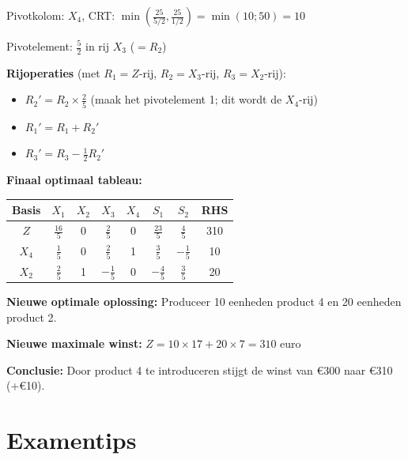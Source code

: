 \documentclass[a4paper,11pt]{article}
\begin{document}
\begin{oefenblok}
    Pivotkolom: $X_4$, CRT: $\min\left(\frac{25}{5/2}, \frac{25}{1/2}\right) = \min(10; 50) = 10$

    Pivotelement: $\frac{5}{2}$ in rij $X_3$ ($=R_2$)

    \textbf{Rijoperaties} (met $R_1 = Z$-rij, $R_2 = X_3$-rij, $R_3 = X_2$-rij):
    \begin{itemize}
        \item $R_2' = R_2 \times \frac{2}{5}$ (maak het pivotelement 1; dit wordt de $X_4$-rij)
        \item $R_1' = R_1 + R_2'$
        \item $R_3' = R_3 - \frac{1}{2}R_2'$
    \end{itemize}

    \textbf{Finaal optimaal tableau:}

    \begin{center}
        \begin{tabular}{c|cccccc|c}
            \hline
            Basis & $X_1$         & $X_2$ & $X_3$          & $X_4$ & $S_1$          & $S_2$          & RHS \\
            \hline
            $Z$   & $\frac{16}{5}$ & 0     & $\frac{2}{5}$  & 0     & $\frac{23}{5}$ & $\frac{4}{5}$  & 310 \\
            $X_4$ & $\frac{1}{5}$ & 0     & $\frac{2}{5}$  & 1     & $\frac{3}{5}$  & $-\frac{1}{5}$ & 10  \\
            $X_2$ & $\frac{2}{5}$ & 1     & $-\frac{1}{5}$ & 0     & $-\frac{4}{5}$ & $\frac{3}{5}$  & 20  \\
            \hline
        \end{tabular}
    \end{center}

    \textbf{Nieuwe optimale oplossing:} Produceer 10 eenheden product 4 en 20 eenheden product 2.

    \textbf{Nieuwe maximale winst:} $Z = 10 \times 17 + 20 \times 7 = 310$ euro

    \textbf{Conclusie:} Door product 4 te introduceren stijgt de winst van €300 naar €310 (+€10).

\end{oefenblok}

\section{Examentips}
\end{document}
